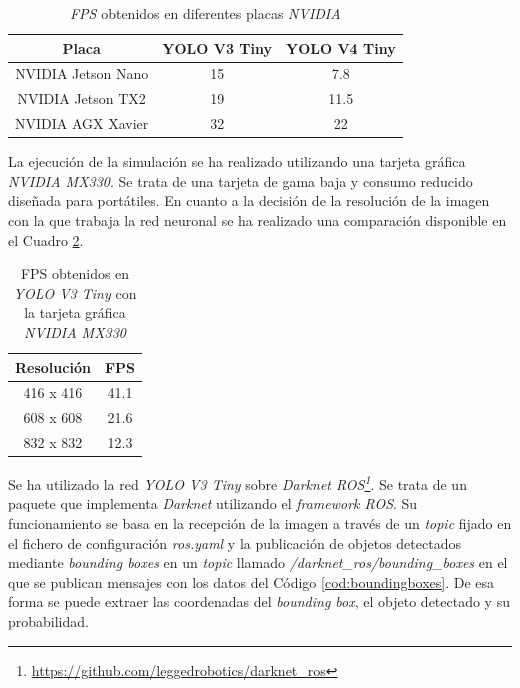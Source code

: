 \begin{table}[H]
	\begin{center}
		\begin{tabular}{|c|c|c|}
			\hline
			\textbf{Placa}     & \textbf{YOLO V3 Tiny} & \textbf{YOLO V4 Tiny}
			\\
			\hline
			NVIDIA Jetson Nano & 15                    & 7.8
			\\

			NVIDIA Jetson TX2  & 19                    & 11.5
			\\
			NVIDIA AGX Xavier  & 32                    & 22
			\\
			\hline
		\end{tabular}
		\caption{\textit{FPS} obtenidos en diferentes placas \textit{NVIDIA}}
		\label{table:v3vsv4}
	\end{center}
\end{table}

La ejecución de la simulación se ha realizado utilizando una tarjeta gráfica \textit{NVIDIA MX330}. Se trata de una tarjeta de gama baja y consumo reducido diseñada para
portátiles. En cuanto a la decisión de la resolución de la imagen con la que trabaja la red neuronal se ha realizado una comparación disponible en el Cuadro
\ref{table:versusnotebook}.\\

\begin{table}[H]
	\begin{center}
		\begin{tabular}{|c|c|}
			\hline
			\textbf{Resolución} & \textbf{FPS}
			\\
			\hline
			416 x 416           & 41.1
			\\
			608 x 608           & 21.6
			\\
			832 x 832           & 12.3
			\\
			\hline
		\end{tabular}
		\caption{FPS obtenidos en \textit{YOLO V3 Tiny} con la tarjeta gráfica \textit{NVIDIA MX330}}
		\label{table:versusnotebook}
	\end{center}
\end{table}

Se ha utilizado la red \textit{YOLO V3 Tiny} sobre \textit{Darknet ROS\footnote{\url{https://github.com/leggedrobotics/darknet_ros}}}. Se trata de un paquete que implementa
\textit{Darknet} utilizando el \textit{framework ROS}. Su funcionamiento se basa en la recepción de la imagen a través de un \textit{topic} fijado en el fichero de configuración
\textit{ros.yaml} y la publicación de objetos detectados mediante \textit{bounding boxes} en un \textit{topic} llamado \textit{/darknet\_ros/bounding\_boxes} en el que se publican
mensajes con los datos del Código \ref{cod:boundingboxes}. De esa forma se puede extraer las coordenadas del \textit{bounding box}, el objeto detectado y su probabilidad.\\

